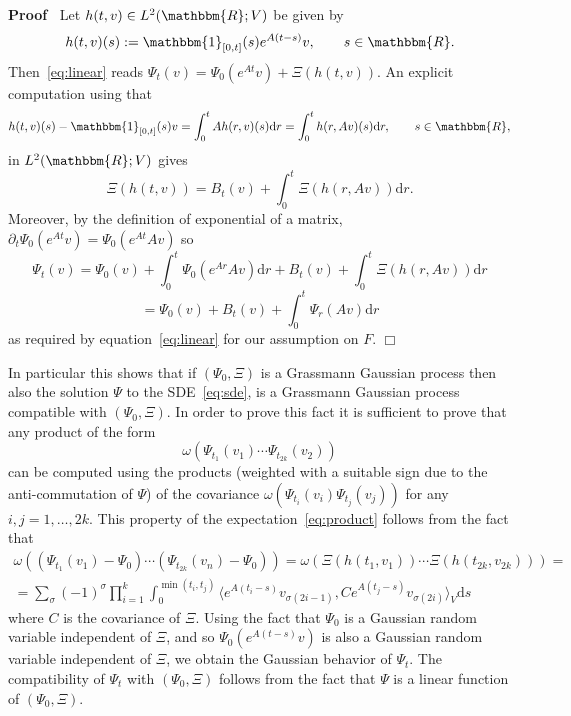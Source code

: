 \documentclass[11pt]{article}
\newcommand{\assign}{:=}
\newcommand{\mathd}{\mathrm{d}}
\newenvironment{proof}{\noindent\textbf{Proof\ }}{\hspace*{\fill}$\Box$\medskip}
\begin{document}
\begin{proof}
  Let $h (t, v) \in L^2 (\mathbbm{R}; V)$ be given by
  \[ h (t, v) (s) \assign \mathbbm{1}_{[0, t]} (s) e^{A (t - s)} v, \qquad s
     \in \mathbbm{R}. \]
  Then~{\eqref{eq:linear}} reads $\Psi_t (v) = \Psi_0 (e^{A t} v) + \Xi (h (t,
  v))$. An explicit computation using that
  \[ h (t, v) (s) -\mathbbm{1}_{[0, t]} (s) v = \int_0^t A h (r, v) (s) \mathd
     r = \int_0^t h (r, A v) (s) \mathd r, \qquad s \in \mathbbm{R}, \]
  in $L^2 (\mathbbm{R}; V)$ gives
  \[ \Xi (h (t, v)) = B_t (v) + \int_0^t \Xi (h (r, A v)) \mathd r. \]
  Moreover, by the definition of exponential of a matrix, $\partial_t \Psi_0
  (e^{A t} v) = \Psi_0 (e^{A t} A v)$ so
  \[ \Psi_t (v) = \Psi_0 (v) + \int_0^t \Psi_0 (e^{A r} A v) \mathd r + B_t
     (v) + \int_0^t \Xi (h (r, A v)) \mathd r \]
  \[ = \Psi_0 (v) + B_t (v) + \int_0^t \Psi_r (A v) \mathd r \]
  as required by equation~{\eqref{eq:linear}} for our assumption on $F$.
\end{proof}

\begin{remark}
  In particular this shows that if $(\Psi_0, \Xi)$ is a Grassmann Gaussian
  process then also the solution $\Psi$ to the SDE~{\eqref{eq:sde}}, is a
  Grassmann Gaussian process compatible with $(\Psi_0, \Xi)$. In order to
  prove this fact it is sufficient to prove that any product of the form
  \begin{equation}
    \omega (\Psi_{t_1} (v_1) \cdots \Psi_{t_{2 k}} (v_2)) \label{eq:product}
  \end{equation}
  can be computed using the products (weighted with a suitable sign due to the
  anti-commutation of $\Psi$) of the covariance $\omega (\Psi_{t_i} (v_i)
  \Psi_{t_j} (v_j))$ for any $i, j = 1, \ldots, 2 k$. This property of the
  expectation~{\eqref{eq:product}} follows from the fact that
  \[ \begin{array}{c}
       \omega ((\Psi_{t_1} (v_1) - \Psi_0) \cdots (\Psi_{t_{2 k}} (v_n) -
       \Psi_0)) = \omega (\Xi (h (t_1, v_1)) \cdots \Xi (h (t_{2 k}, v_{2
       k}))) =\\
       = \sum_{\sigma} (- 1)^{\sigma} \prod_{i = 1}^k \int_0^{\min (t_i, t_j)}
       \langle e^{A (t_i - s)} v_{\sigma (2 i - 1)}, C e^{A (t_j - s)}
       v_{\sigma (2 i)} \rangle_V \mathd s
     \end{array} \]
  where $C$ is the covariance of $\Xi$. Using the fact that $\Psi_0$ is a
  Gaussian random variable independent of $\Xi$, and so $\Psi_0 (e^{A (t - s)}
  v)$ is also a Gaussian random variable independent of $\Xi$, we obtain the
  Gaussian behavior of $\Psi_t$. The compatibility of $\Psi_t$ with $(\Psi_0,
  \Xi)$ follows from the fact that $\Psi$ is a linear function of $(\Psi_0,
  \Xi) .$
\end{remark}
\end{document}
